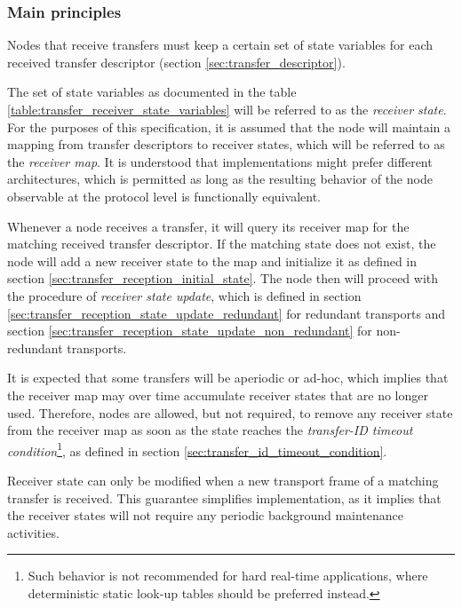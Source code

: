 \subsubsection{Main principles}

Nodes that receive transfers must keep a certain set of state variables for each
received transfer descriptor (section \ref{sec:transfer_descriptor}).

The set of state variables as documented in the table \ref{table:transfer_receiver_state_variables}
will be referred to as the \emph{receiver state}.
For the purposes of this specification, it is assumed that the node will maintain a
mapping from transfer descriptors to receiver states, which will be referred to as the \emph{receiver map}.
It is understood that implementations might prefer different architectures, which is permitted as
long as the resulting behavior of the node observable at the protocol level is functionally equivalent.

Whenever a node receives a transfer, it will query its receiver map for the matching received transfer descriptor.
If the matching state does not exist, the node will add a new receiver state to the map
and initialize it as defined in section \ref{sec:transfer_reception_initial_state}.
The node then will proceed with the procedure of \emph{receiver state update},
which is defined in section \ref{sec:transfer_reception_state_update_redundant} for redundant transports
and section \ref{sec:transfer_reception_state_update_non_redundant} for non-redundant transports.

It is expected that some transfers will be aperiodic or ad-hoc,
which implies that the receiver map may over time accumulate receiver states that are no longer used.
Therefore, nodes are allowed, but not required, to remove any receiver state from the receiver map
as soon as the state reaches the \emph{transfer-ID timeout condition}\footnote{Such behavior is
not recommended for hard real-time applications, where deterministic static look-up tables
should be preferred instead.},
as defined in section \ref{sec:transfer_id_timeout_condition}.

Receiver state can only be modified when a new transport frame of a matching transfer is received.
This guarantee simplifies implementation, as it implies that the receiver states will not
require any periodic background maintenance activities.

